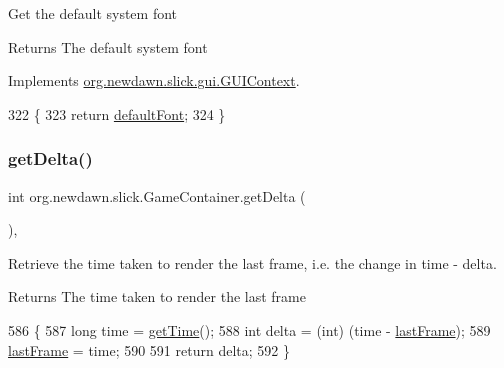 Get the default system font

\begin{DoxyReturn}{Returns}
The default system font 
\end{DoxyReturn}


Implements \mbox{\hyperlink{interfaceorg_1_1newdawn_1_1slick_1_1gui_1_1_g_u_i_context_a85b319f98e2881a0236edfe0dcdf71af}{org.\+newdawn.\+slick.\+gui.\+G\+U\+I\+Context}}.


\begin{DoxyCode}
322                                  \{
323         \textcolor{keywordflow}{return} \mbox{\hyperlink{classorg_1_1newdawn_1_1slick_1_1_game_container_a42d2acd12fa335270fdea3fd9d739d55}{defaultFont}};
324     \}
\end{DoxyCode}
\mbox{\label{classorg_1_1newdawn_1_1slick_1_1_game_container_a47af7100d91a7101cb71574dc70fb0dc}} 
\subsubsection{\texorpdfstring{get\+Delta()}{getDelta()}}
{\footnotesize\ttfamily int org.\+newdawn.\+slick.\+Game\+Container.\+get\+Delta (\begin{DoxyParamCaption}{ }\end{DoxyParamCaption})\hspace{0.3cm}{\ttfamily [inline]}, {\ttfamily [protected]}}

Retrieve the time taken to render the last frame, i.\+e. the change in time -\/ delta.

\begin{DoxyReturn}{Returns}
The time taken to render the last frame 
\end{DoxyReturn}

\begin{DoxyCode}
586                              \{
587         \textcolor{keywordtype}{long} time = \mbox{\hyperlink{classorg_1_1newdawn_1_1slick_1_1_game_container_a1650b161216693ec0b4c0d9d00496c05}{getTime}}();
588         \textcolor{keywordtype}{int} delta = (int) (time - \mbox{\hyperlink{classorg_1_1newdawn_1_1slick_1_1_game_container_ab61d2b2082e7bdf429ded14d1caa5484}{lastFrame}});
589         \mbox{\hyperlink{classorg_1_1newdawn_1_1slick_1_1_game_container_ab61d2b2082e7bdf429ded14d1caa5484}{lastFrame}} = time;
590         
591         \textcolor{keywordflow}{return} delta;
592     \}
\end{DoxyCode}
\mbox{\label{classorg_1_1newdawn_1_1slick_1_1_game_container_a58fc28d337ceef4846542a0b93ea24ec}} 
